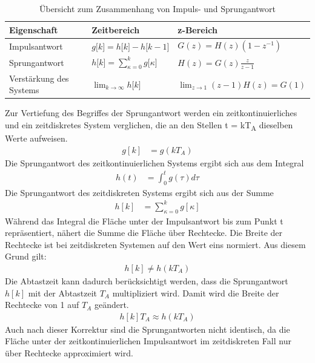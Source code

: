 \begin{table}
  \centering
  \caption{Übersicht zum Zusammenhang von Impuls- und Sprungantwort}
  \label{tab:6.2}
  \begin{tabular}{lll}
    \toprule
    Eigenschaft & Zeitbereich & z-Bereich \\
    \midrule
    Impulsantwort & \(g\lbrack k\rbrack = h\lbrack k\rbrack - h\lbrack k - 1\rbrack\) & \(G(z) = H(z)  \left( 1 - z^{- 1} \right)\) \\
    Sprungantwort & \(h\lbrack k\rbrack = \sum\limits_{\kappa = 0}^{k}{g\lbrack\kappa\rbrack}\) & \(H(z) = G(z)  \frac{z}{z - 1}\) \\
    Verstärkung des Systems & \(\lim_{k \rightarrow \infty}h\lbrack k\rbrack\) & \(\lim_{z \rightarrow 1}(z - 1)  H(z) = G(1)\) \\
    \bottomrule
  \end{tabular}
\end{table}

Zur Vertiefung des Begriffes der Sprungantwort werden ein zeitkontinuierliches und ein zeitdiskretes System verglichen, die an den Stellen t = kT\textsubscript{A} dieselben Werte aufweisen.
\begin{align}
g[ k] &= g\left( k  T_{A} \right) \label{eq:6.41}
\end{align}
Die Sprungantwort des zeitkontinuierlichen Systems ergibt sich aus dem Integral
\begin{align}
h(t) &= \int_{0}^{t}{g(\tau)}d\tau \label{eq:6.42}
\end{align}
Die Sprungantwort des zeitdiskreten Systems ergibt sich aus der Summe
\begin{align}
h[ k] &= \sum\limits_{\kappa = 0}^{k}{g[\kappa]} \label{eq:6.43}
\end{align}
Während das Integral die Fläche unter der Impulsantwort bis zum Punkt t repräsentiert, nähert die Summe die Fläche über Rechtecke. Die Breite der Rechtecke ist bei zeitdiskreten Systemen auf den Wert eins normiert. Aus diesem Grund gilt:
\begin{align}
h[ k] \neq h\left( k  T_{A} \right) \label{eq:6.44}
\end{align}
Die Abtastzeit kann dadurch berücksichtigt werden, dass die Sprungantwort \(h[k]\) mit der Abtastzeit \(T_{A}\) multipliziert wird. Damit wird die Breite der Rechtecke von 1 auf \(T_{A}\) geändert.
\begin{align}
h[ k]  T_{A} \approx h\left( k  T_{A} \right) \label{eq:6.45}
\end{align}
Auch nach dieser Korrektur sind die Sprungantworten nicht identisch, da die Fläche unter der zeitkontinuierlichen Impulsantwort im zeitdiskreten Fall nur über Rechtecke approximiert wird.

